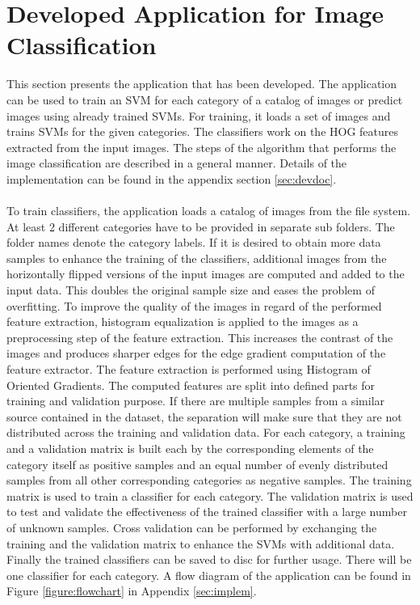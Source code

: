 
\section{Developed Application for Image Classification}\label{sec:application}

This section presents the application that has been developed. The application can be used to train an SVM for each category of a catalog of images or predict images using already trained SVMs. For training, it loads a set of images and trains SVMs for the given categories. The classifiers work on the HOG features extracted from the input images. The steps of the algorithm that performs the image classification are described in a general manner. Details of the implementation can be found in the appendix section \ref{sec:devdoc}.
\\
\\
To train classifiers, the application loads a catalog of images from the file system. At least 2 different categories have to be provided in separate sub folders. The folder names denote the category labels. If it is desired to obtain more data samples to enhance the training of the classifiers, additional images from the horizontally flipped versions of the input images are computed and added to the input data. This doubles the original sample size and eases the problem of overfitting. To improve the quality of the images in regard of the performed feature extraction, histogram equalization is applied to the images as a preprocessing step of the feature extraction. This increases the contrast of the images and produces sharper edges for the edge gradient computation of the feature extractor. The feature extraction is performed using Histogram of Oriented Gradients. The computed features are split into defined parts for training and validation purpose. If there are multiple samples from a similar source contained in the dataset, the separation will make sure that they are not distributed across the training and validation data. For each category, a training and a validation matrix is built each by the corresponding elements of the category itself as positive samples and an equal number of evenly distributed samples from all other corresponding categories as negative samples. The training matrix is used to train a classifier for each category. The validation matrix is used to test and validate the effectiveness of the trained classifier with a large number of unknown samples. Cross validation can be performed by exchanging the training and the validation matrix to enhance the SVMs with additional data. Finally the trained classifiers can be saved to disc for further usage. There will be one classifier for each category. A flow diagram of the application can be found in Figure \ref{figure:flowchart} in Appendix \ref{sec:implem}.
